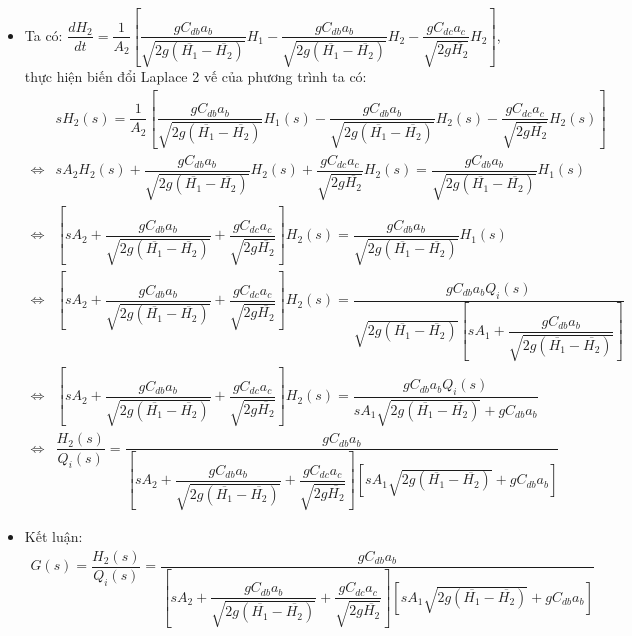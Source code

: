 \begin{enumerate}[\it a.]
\begin{itemize}
                \item Ta có: $\dfrac{dH_2}{dt} = \dfrac{1}{A_2} \left[{\dfrac{g C_{db}a_b}{\sqrt{2g(\overline{H_1} - \overline{H_2})}} H_1 - \dfrac{g C_{db}a_b}{\sqrt{2g(\overline{H_1} - \overline{H_2})}} H_2 - \dfrac{g C_{dc}a_c}{\sqrt{2g\overline{H_2}}} H_2}\right]$, thực hiện biến đổi Laplace 2 vế của phương trình ta có:
                    \begin{align}
                        & s H_2(s) = \dfrac{1}{A_2} \left[{\dfrac{g C_{db}a_b}{\sqrt{2g(\overline{H_1} - \overline{H_2})}} H_1(s) - \dfrac{g C_{db}a_b}{\sqrt{2g(\overline{H_1} - \overline{H_2})}} H_2(s) - \dfrac{g C_{dc}a_c}{\sqrt{2g\overline{H_2}}} H_2(s)}\right] \\
                        \Longleftrightarrow & s A_2 H_2(s) + \dfrac{g C_{db}a_b}{\sqrt{2g(\overline{H_1} - \overline{H_2})}} H_2(s) + \dfrac{g C_{dc}a_c}{\sqrt{2g\overline{H_2}}} H_2(s) = \dfrac{g C_{db}a_b}{\sqrt{2g(\overline{H_1} - \overline{H_2})}} H_1(s) \\
                        \Longleftrightarrow & \left[{s A_2 + \dfrac{g C_{db}a_b}{\sqrt{2g(\overline{H_1} - \overline{H_2})}} + \dfrac{g C_{dc}a_c}{\sqrt{2g\overline{H_2}}}}\right] H_2(s) = \dfrac{g C_{db}a_b}{\sqrt{2g(\overline{H_1} - \overline{H_2})}} H_1(s)\\
                        \Longleftrightarrow & \left[{s A_2 + \dfrac{g C_{db}a_b}{\sqrt{2g(\overline{H_1} - \overline{H_2})}} + \dfrac{g C_{dc}a_c}{\sqrt{2g\overline{H_2}}}}\right] H_2(s) = \dfrac{g C_{db}a_b Q_i(s)}{\sqrt{2g(\overline{H_1} - \overline{H_2})} \left[{s A_1 + \dfrac{gC_{db}a_b}{\sqrt{2g(\overline{H_1} - \overline{H_2})}}}\right]} \\
                        \Longleftrightarrow & \left[{s A_2 + \dfrac{g C_{db}a_b}{\sqrt{2g(\overline{H_1} - \overline{H_2})}} + \dfrac{g C_{dc}a_c}{\sqrt{2g\overline{H_2}}}}\right] H_2(s) = \dfrac{g C_{db}a_b Q_i(s)}{s A_1 \sqrt{2g(\overline{H_1} - \overline{H_2})} + gC_{db}a_b} \\
                        \Longleftrightarrow & \dfrac{H_2(s)}{Q_i(s)} = \dfrac{g C_{db}a_b}{\left[{s A_2 + \dfrac{g C_{db}a_b}{ \sqrt{2g(\overline{H_1} - \overline{H_2})}} + \dfrac{g C_{dc}a_c}{\sqrt{2g\overline{H_2}}}}\right] \left[{s A_1 \sqrt{2g(\overline{H_1} - \overline{H_2})} + gC_{db}a_b}\right]}
                    \end{align}

                \item Kết luận:
                    \begin{align}
                        G(s) = \dfrac{H_2(s)}{Q_i(s)} = \dfrac{g C_{db}a_b}{\left[{s A_2 + \dfrac{g C_{db}a_b}{ \sqrt{2g(\overline{H_1} - \overline{H_2})}} + \dfrac{g C_{dc}a_c}{\sqrt{2g\overline{H_2}}}}\right] \left[{ s A_1 \sqrt{2g(\overline{H_1} - \overline{H_2})} + gC_{db}a_b}\right]}
                    \end{align}
            \end{itemize}
    \end{enumerate}
